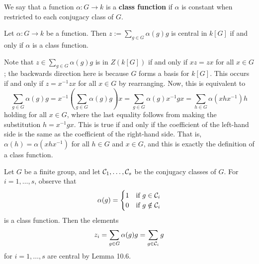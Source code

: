 \begin{defn}
    We say that a function $\alpha : G \to k$ is a {\bf class function} if 
    $\alpha$ is constant when restricted to each conjugacy class of $G$. 
\end{defn} 

\begin{lemma}
    Let $\alpha : G \to k$ be a function. Then $z := \sum_{g \in G} 
    \alpha(g) g$ is central in $k[G]$ if and only if $\alpha$ is a 
    class function. 
\end{lemma}
\begin{pf}
    Note that $z \in \sum_{g \in G} \alpha(g)g$ is in $Z(k[G])$ if and only if 
    $xz = zx$ for all $x \in G$; the backwards direction here is because $G$ 
    forms a basis for $k[G]$. This occurs if and only if 
    $z = x^{-1}zx$ for all $x \in G$ by rearranging. Now, this is 
    equivalent to 
    \[ \sum_{g \in G} \alpha(g)g = x^{-1} \left( \sum_{g \in G}
    \alpha(g)g \right) x = \sum_{g \in G} \alpha(g)x^{-1}gx
    = \sum_{h \in G} \alpha(xhx^{-1}) h \] 
    holding for all $x \in G$, where the last equality follows from 
    making the substitution $h = x^{-1}gx$. This is true if and only if 
    the coefficient of the left-hand side is the same as the 
    coefficient of the right-hand side. That is, $\alpha(h) = 
    \alpha(xhx^{-1})$ for all $h \in G$ and $x \in G$, and this is exactly 
    the definition of a class function. 
\end{pf}

Let $G$ be a finite group, and let ${\cal C}_1, 
\dots, {\cal C}_s$ be the conjugacy classes of $G$. For $i = 1, \dots, s$, 
observe that 
\[ \alpha(g) = \begin{cases} 1 & \text{if } g \in {\cal C}_i \\ 
    0 & \text{if } g \notin {\cal C}_i \end{cases} \]
is a class function. Then the elements 
\[ z_i = \sum_{g \in G} \alpha(g) g = \sum_{g \in {\cal C}_i} g \] 
for $i = 1, \dots, s$ are central by Lemma 10.6. 

